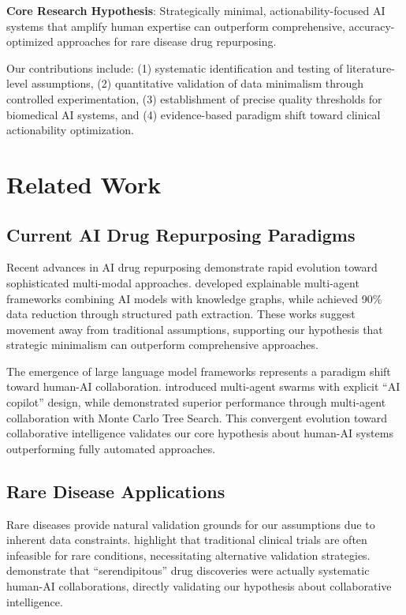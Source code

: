 \documentclass{article}
\begin{document}
\textbf{Core Research Hypothesis}: Strategically minimal, actionability-focused AI systems that amplify human expertise can outperform comprehensive, accuracy-optimized approaches for rare disease drug repurposing.

Our contributions include: (1) systematic identification and testing of literature-level assumptions, (2) quantitative validation of data minimalism through controlled experimentation, (3) establishment of precise quality thresholds for biomedical AI systems, and (4) evidence-based paradigm shift toward clinical actionability optimization.

\section{Related Work}

\subsection{Current AI Drug Repurposing Paradigms}

Recent advances in AI drug repurposing demonstrate rapid evolution toward sophisticated multi-modal approaches. \citet{drugagent_2024} developed explainable multi-agent frameworks combining AI models with knowledge graphs, while \citet{kpaths_2025} achieved 90\% data reduction through structured path extraction. These works suggest movement away from traditional assumptions, supporting our hypothesis that strategic minimalism can outperform comprehensive approaches.

The emergence of large language model frameworks represents a paradigm shift toward human-AI collaboration. \citet{pharmaswarm_2025} introduced multi-agent swarms with explicit ``AI copilot'' design, while \citet{drugmcts_2025} demonstrated superior performance through multi-agent collaboration with Monte Carlo Tree Search. This convergent evolution toward collaborative intelligence validates our core hypothesis about human-AI systems outperforming fully automated approaches.

\subsection{Rare Disease Applications}

Rare diseases provide natural validation grounds for our assumptions due to inherent data constraints. \citet{cortial_rare_2024} highlight that traditional clinical trials are often infeasible for rare conditions, necessitating alternative validation strategies. \citet{challa_human_ai_2021} demonstrate that ``serendipitous'' drug discoveries were actually systematic human-AI collaborations, directly validating our hypothesis about collaborative intelligence.
\end{document}
